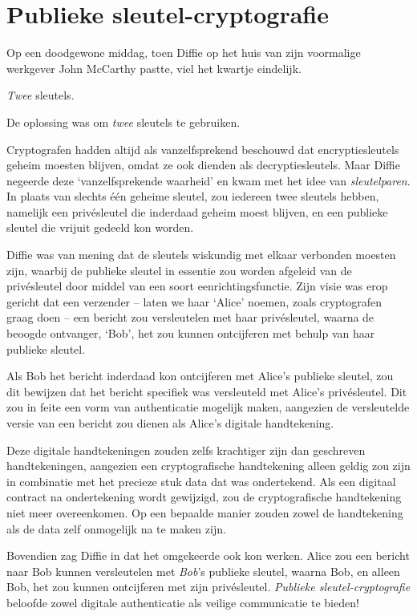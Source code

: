 \documentclass[smalldemyvopaper,11pt,twoside,onecolumn,openright,extrafontsizes,hidelinks]{memoir}
\begin{document}
\section{Publieke
sleutel-cryptografie}\label{publieke-sleutel-cryptografie}

Op een doodgewone middag, toen Diffie op het huis van zijn voormalige
werkgever John McCarthy pastte, viel het kwartje eindelijk.

\emph{Twee} sleutels.

De oplossing was om \emph{twee} sleutels te gebruiken.

Cryptografen hadden altijd als vanzelfsprekend beschouwd dat
encryptiesleutels geheim moesten blijven, omdat ze ook dienden als
decryptiesleutels. Maar Diffie negeerde deze `vanzelfsprekende waarheid'
en kwam met het idee van \emph{sleutelparen}. In plaats van slechts één
geheime sleutel, zou iedereen twee sleutels hebben, namelijk een
privésleutel die inderdaad geheim moest blijven, en een publieke sleutel
die vrijuit gedeeld kon worden.

Diffie was van mening dat de sleutels wiskundig met elkaar verbonden
moesten zijn, waarbij de publieke sleutel in essentie zou worden
afgeleid van de privésleutel door middel van een soort
eenrichtingsfunctie. Zijn visie was erop gericht dat een verzender --
laten we haar `Alice' noemen, zoals cryptografen graag doen -- een
bericht zou versleutelen met haar privésleutel, waarna de beoogde
ontvanger, `Bob', het zou kunnen ontcijferen met behulp van haar
publieke sleutel.

Als Bob het bericht inderdaad kon ontcijferen met Alice's publieke
sleutel, zou dit bewijzen dat het bericht specifiek was versleuteld met
Alice's privésleutel. Dit zou in feite een vorm van authenticatie
mogelijk maken, aangezien de versleutelde versie van een bericht zou
dienen als Alice's digitale handtekening.

Deze digitale handtekeningen zouden zelfs krachtiger zijn dan geschreven
handtekeningen, aangezien een cryptografische handtekening alleen geldig
zou zijn in combinatie met het precieze stuk data dat was ondertekend.
Als een digitaal contract na ondertekening wordt gewijzigd, zou de
cryptografische handtekening niet meer overeenkomen. Op een bepaalde
manier zouden zowel de handtekening als de data zelf onmogelijk na te
maken zijn.

Bovendien zag Diffie in dat het omgekeerde ook kon werken. Alice zou een
bericht naar Bob kunnen versleutelen met \emph{Bob}'s publieke sleutel,
waarna Bob, en alleen Bob, het zou kunnen ontcijferen met zijn
privésleutel. \emph{Publieke sleutel-cryptografie} beloofde zowel
digitale authenticatie als veilige communicatie te bieden!
\end{document}
